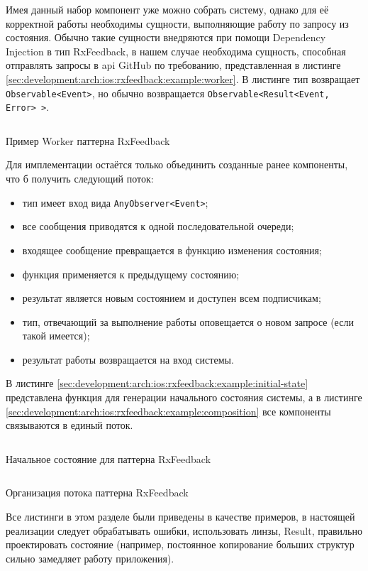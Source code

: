 Имея данный набор компонент уже можно собрать систему, однако для её корректной работы необходимы сущности, выполняющие работу по запросу из состояния. Обычно такие сущности внедряются при помощи Dependency Injection в тип RxFeedback, в нашем случае необходима сущность, способная отправлять запросы в \gls{api} GitHub по требованию, представленная в листинге \ref{sec:development:arch:ios:rxfeedback:example:worker}. В листинге тип возвращает \texttt{Observable<Event>}, но обычно возвращается \texttt{Observable<Result<Event, Error> >}.

\begin{code}
  \inputminted{swift}{inc/src/rx-feedback-worker.swift}
   \caption{Пример Worker паттерна RxFeedback}
   \label{sec:development:arch:ios:rxfeedback:example:worker}
\end{code}

Для имплементации остаётся только объединить созданные ранее компоненты, что б получить следующий поток:

\begin{itemize}
  \item тип имеет вход вида \texttt{AnyObserver<Event>};
  \item все сообщения приводятся к одной последовательной очереди;
  \item входящее сообщение превращается в функцию изменения состояния;
  \item функция применяется к предыдущему состоянию;
  \item результат является новым состоянием и доступен всем подписчикам;
  \item тип, отвечающий за выполнение работы оповещается о новом запросе (если такой имеется);
  \item результат работы возвращается на вход системы.
\end{itemize}

В листинге \ref{sec:development:arch:ios:rxfeedback:example:initial-state} представлена функция для генерации начального состояния системы, а в листинге \ref{sec:development:arch:ios:rxfeedback:example:composition} все компоненты связываются в единый поток.

\begin{code}
  \inputminted{swift}{inc/src/rx-feedback-initial-state.swift}
   \caption{Начальное состояние для паттерна RxFeedback}
   \label{sec:development:arch:ios:rxfeedback:example:initial-state}
\end{code}

\begin{code}
  \inputminted{swift}{inc/src/rx-feedback-composition.swift}
   \caption{Организация потока паттерна RxFeedback}
   \label{sec:development:arch:ios:rxfeedback:example:composition}
\end{code}

Все листинги в этом разделе были приведены в качестве примеров, в настоящей реализации следует обрабатывать ошибки, использовать линзы, Result, правильно проектировать состояние (например, постоянное копирование больших структур сильно замедляет работу приложения).

\FloatBarrier